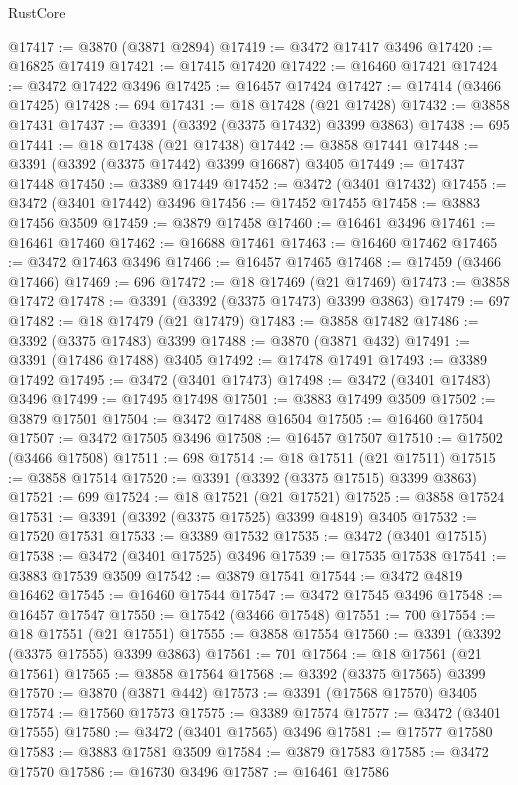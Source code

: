 \begin{lexlean}{RustCore}
\begin{coremodule}
@17417 := @3870 (@3871 @2894)
@17419 := @3472 @17417 @3496
@17420 := @16825 @17419
@17421 := @17415 @17420
@17422 := @16460 @17421
@17424 := @3472 @17422 @3496
@17425 := @16457 @17424
@17427 := @17414 (@3466 @17425)
@17428 := 694
@17431 := @18 @17428 (@21 @17428)
@17432 := @3858 @17431
@17437 := @3391 (@3392 (@3375 @17432) @3399 @3863)
@17438 := 695
@17441 := @18 @17438 (@21 @17438)
@17442 := @3858 @17441
@17448 := @3391 (@3392 (@3375 @17442) @3399 @16687) @3405
@17449 := @17437 @17448
@17450 := @3389 @17449
@17452 := @3472 (@3401 @17432)
@17455 := @3472 (@3401 @17442) @3496
@17456 := @17452 @17455
@17458 := @3883 @17456 @3509
@17459 := @3879 @17458
@17460 := @16461 @3496
@17461 := @16461 @17460
@17462 := @16688 @17461
@17463 := @16460 @17462
@17465 := @3472 @17463 @3496
@17466 := @16457 @17465
@17468 := @17459 (@3466 @17466)
@17469 := 696
@17472 := @18 @17469 (@21 @17469)
@17473 := @3858 @17472
@17478 := @3391 (@3392 (@3375 @17473) @3399 @3863)
@17479 := 697
@17482 := @18 @17479 (@21 @17479)
@17483 := @3858 @17482
@17486 := @3392 (@3375 @17483) @3399
@17488 := @3870 (@3871 @432)
@17491 := @3391 (@17486 @17488) @3405
@17492 := @17478 @17491
@17493 := @3389 @17492
@17495 := @3472 (@3401 @17473)
@17498 := @3472 (@3401 @17483) @3496
@17499 := @17495 @17498
@17501 := @3883 @17499 @3509
@17502 := @3879 @17501
@17504 := @3472 @17488 @16504
@17505 := @16460 @17504
@17507 := @3472 @17505 @3496
@17508 := @16457 @17507
@17510 := @17502 (@3466 @17508)
@17511 := 698
@17514 := @18 @17511 (@21 @17511)
@17515 := @3858 @17514
@17520 := @3391 (@3392 (@3375 @17515) @3399 @3863)
@17521 := 699
@17524 := @18 @17521 (@21 @17521)
@17525 := @3858 @17524
@17531 := @3391 (@3392 (@3375 @17525) @3399 @4819) @3405
@17532 := @17520 @17531
@17533 := @3389 @17532
@17535 := @3472 (@3401 @17515)
@17538 := @3472 (@3401 @17525) @3496
@17539 := @17535 @17538
@17541 := @3883 @17539 @3509
@17542 := @3879 @17541
@17544 := @3472 @4819 @16462
@17545 := @16460 @17544
@17547 := @3472 @17545 @3496
@17548 := @16457 @17547
@17550 := @17542 (@3466 @17548)
@17551 := 700
@17554 := @18 @17551 (@21 @17551)
@17555 := @3858 @17554
@17560 := @3391 (@3392 (@3375 @17555) @3399 @3863)
@17561 := 701
@17564 := @18 @17561 (@21 @17561)
@17565 := @3858 @17564
@17568 := @3392 (@3375 @17565) @3399
@17570 := @3870 (@3871 @442)
@17573 := @3391 (@17568 @17570) @3405
@17574 := @17560 @17573
@17575 := @3389 @17574
@17577 := @3472 (@3401 @17555)
@17580 := @3472 (@3401 @17565) @3496
@17581 := @17577 @17580
@17583 := @3883 @17581 @3509
@17584 := @3879 @17583
@17585 := @3472 @17570
@17586 := @16730 @3496
@17587 := @16461 @17586

\end{coremodule}
\end{lexlean}
